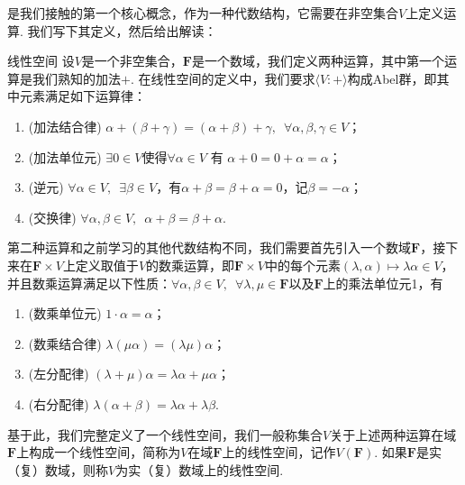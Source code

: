 是我们接触的第一个核心概念，作为一种代数结构，它需要在非空集合$V$上定义运算. 我们写下其定义，然后给出解读：
\begin{definition}{线性空间}{}
    设$V$是一个非空集合，$\mathbf{F}$是一个数域，我们定义两种运算，其中第一个运算是我们熟知的加法$+$. 在线性空间的定义中，我们要求$\langle V\colon+\rangle$构成Abel群，即其中元素满足如下运算律：
    \begin{enumerate}
        \item (加法结合律) $\alpha+(\beta+\gamma)=(\alpha+\beta)+\gamma,\enspace\forall \alpha,\beta,\gamma \in V$；

        \item (加法单位元) $\exists 0 \in V$使得$\forall\alpha\in V$ 有 $\alpha + 0 = 0 + \alpha = \alpha$；

        \item (逆元) $\forall\alpha\in V,\enspace \exists \beta \in V$，有$\alpha+\beta=\beta+\alpha=0$，记$\beta=-\alpha$；

        \item (交换律) $\forall\alpha, \beta\in V,\enspace \alpha+\beta=\beta+\alpha$.
    \end{enumerate}

    第二种运算和之前学习的其他代数结构不同，我们需要首先引入一个数域$\mathbf{F}$，接下来在$\mathbf{F}\times V$上定义取值于$V$的数乘运算，即$\mathbf{F}\times V$中的每个元素$(\lambda,\alpha)\mapsto \lambda\alpha\in V$，并且数乘运算满足以下性质：$\forall \alpha,\beta \in V,\enspace\forall \lambda,\mu\in\mathbf{F}$以及$\mathbf{F}$上的乘法单位元1，有
    \begin{enumerate}
        \item (数乘单位元) $1\cdot \alpha=\alpha$；

        \item (数乘结合律) $\lambda(\mu\alpha)=(\lambda\mu)\alpha$；

        \item (左分配律) $(\lambda+\mu)\alpha=\lambda\alpha+\mu\alpha$；

        \item (右分配律) $\lambda(\alpha+\beta)=\lambda\alpha+\lambda\beta$.
    \end{enumerate}

    基于此，我们完整定义了一个线性空间，我们一般称集合$V$关于上述两种运算在域$\mathbf{F}$上构成一个线性空间，简称为$V$在域$\mathbf{F}$上的线性空间，记作$V(\mathbf{F})$. 如果$\mathbf{F}$是实（复）数域，则称$V$为实（复）数域上的线性空间.
\end{definition}
